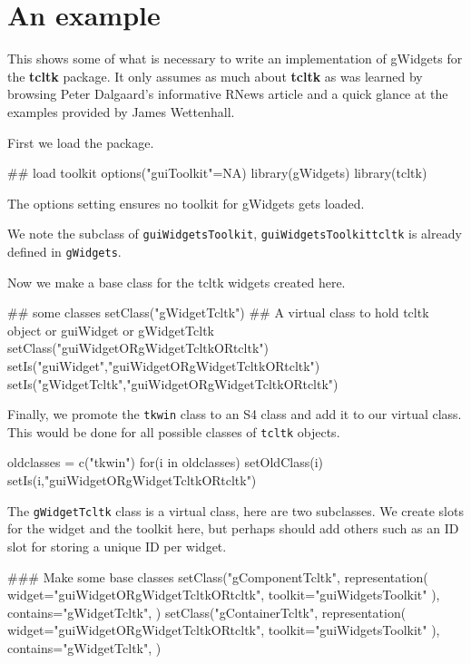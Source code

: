\documentclass[12pt]{article}
\newcommand{\RCode}[1]{\texttt{#1}}
\newcommand{\RPackage}[1]{\textbf{#1}}
\begin{document}
\section{An example}


This shows some of what is necessary to write an implementation of
gWidgets for the \RPackage{tcltk} package.  It only assumes as much
about \RPackage{tcltk} as was learned by browsing Peter Dalgaard's
informative RNews article and a quick glance at the examples provided
by James Wettenhall.




First we load the package.
\begin{Scode}
  ## load toolkit 
  options("guiToolkit"=NA)
  library(gWidgets)
  library(tcltk)
\end{Scode}

The options setting ensures no toolkit for gWidgets gets loaded.

We note the subclass of \RCode{guiWidgetsToolkit},
\RCode{guiWidgetsToolkittcltk} is already defined in \RCode{gWidgets}.

Now we make a base class for the tcltk widgets created here.
\begin{Scode}
  ## some classes
  setClass("gWidgetTcltk")
  ## A virtual class to hold tcltk object or guiWidget or gWidgetTcltk
  setClass("guiWidgetORgWidgetTcltkORtcltk")
  setIs("guiWidget","guiWidgetORgWidgetTcltkORtcltk")
  setIs("gWidgetTcltk","guiWidgetORgWidgetTcltkORtcltk")
\end{Scode}

Finally, we promote the \RCode{tkwin} class to an S4 class and add it
to our virtual class. This would be done for all possible classes of
\RCode{tcltk} objects.

\begin{Scode}
  oldclasses = c("tkwin")
  for(i in oldclasses) {
    setOldClass(i)
    setIs(i,"guiWidgetORgWidgetTcltkORtcltk")
  }
\end{Scode}


The \RCode{gWidgetTcltk} class is a virtual class, here are two
subclasses. We create slots for the widget and the toolkit here, but
perhaps should add others such as an ID slot for storing a unique ID
per widget.

\begin{Scode}
### Make some base classes
setClass("gComponentTcltk",
representation(
widget="guiWidgetORgWidgetTcltkORtcltk",
toolkit="guiWidgetsToolkit"
),
contains="gWidgetTcltk",
)
setClass("gContainerTcltk",
representation(
widget="guiWidgetORgWidgetTcltkORtcltk",
toolkit="guiWidgetsToolkit"
),
contains="gWidgetTcltk",
)
\end{Scode}
\end{document}
